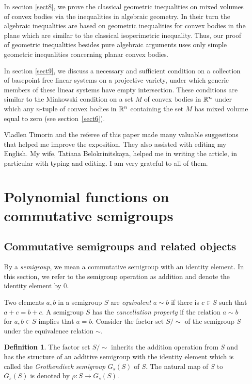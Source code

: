 \documentclass[11pt]{article}
\theoremstyle{plain}
\theoremstyle{definition}
\newtheorem{definition}[theorem]{Definition}
\begin{document}
In section \ref{sect8}, we prove the classical geometric inequalities on mixed volumes of convex bodies via the inequalities in algebraic geometry. In
their  turn the algebraic inequalities are based on  geometric inequalities for convex bodies in the plane which are similar to the classical isoperimetric inequality. Thus, our proof of geometric inequalities besides  pure algebraic arguments uses only simple geometric inequalities concerning planar convex bodies.

In section \ref{sect9}, we discuss a necessary and sufficient  condition on a collection of basepoint free linear systems on a projective variety, under which generic members of these linear systems have empty intersection. These conditions are similar to the Minkowski condition on a set $M$ of convex bodies in $\Bbb R^n$ under which any $n$-tuple of convex bodies in $\Bbb R^n$ containing the set $M$ has mixed volume
equal to zero (see section~\ref{sect6}).

Vladlen Timorin and the referee of this paper made many valuable suggestions that helped me improve the exposition. They also assisted with editing my English. My wife, Tatiana Belokrinitskaya, helped me in writing the article, in particular with typing and editing. I am very grateful to all of them.

\section{Polynomial functions on commutative semigroups}\label{sect2}

\subsection{Commutative semigroups and related objects}
By a {\it semigroup}, we mean a commutative semigroup with an identity element. In this section, we refer to the semigroup operation  as addition and denote the identity element  by $0$.

Two elements $a,b$ in a  semigroup $S$  are {\it equivalent} $a\sim b $  if there is  $c\in S$ such that $a+c=b+c$.  A semigroup $S$ has  the
{\it cancellation property}  if   the  relation  $a\sim b $ for $a,b\in S$  implies that $a=b$. Consider the factor-set $S/\sim$ of the semigroup
$S$ under  the equivalence relation $\sim$.

\begin{definition}
  The factor set $S/\sim$ inherits the addition operation from $S$ and
has the structure of an additive semigroup with the identity element
which is called the  {\it  Grothendieck semigroup}  $G_s (S)$ of $S$.
The natural map of $S$ to $G_s(S)$ is denoted by $\rho: S \to G_s(S)$.
\end{definition}
\end{document}
